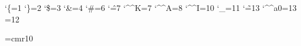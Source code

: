 \catcode `\{=1 %
\catcode `\}=2 %
\catcode `\$=3 %
\catcode `\&=4 %
\catcode `\#=6 %
\catcode `\^=7 %
\catcode `\^^K=7 %
\catcode `\^^A=8 %
\catcode `\^^I=10 %
\catcode `\_=11 %
\catcode `\~=13 %
\catcode `\^^a0=13 %
=12 %



\font\tenrm=cmr10
\tenrm
\pagewidth=210mm
\pageheight=297mm
\hoffset=25mm
\voffset=25mm

\def\frame#1{%
    \hbox{%
        \vrule
	\vtop{%
	    \vbox{%
	        \hrule
                \kern1pt
                \hbox{%
                    \kern1pt
                    {#1}%
                    \kern1pt
                }%
            }%
            \kern1pt
            \hrule
        }%
        \vrule
    }%
}

\def\shipout{\directlua{
    local function cb(head)
        require("nodetree").print(head)
        require("viznodelist").nodelist_visualize(head, "\jobname.gv")
        return head
    end
    local head = token.scan_list()
    tex.box[0] = head
    cb(head)
    tex.shipout(0)
}}
